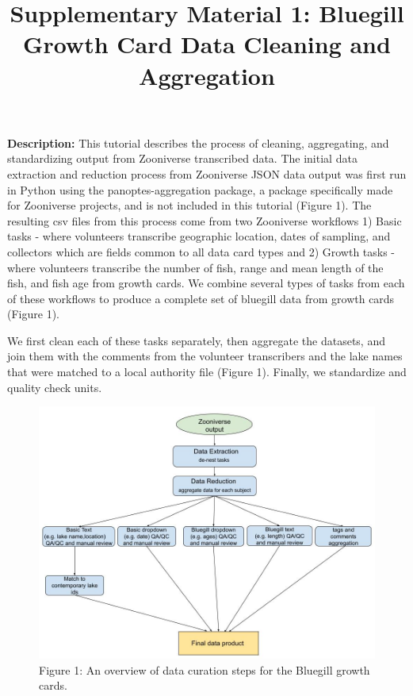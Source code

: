 \documentclass[
]{article}
\title{Supplementary Material 1: Bluegill Growth Card Data Cleaning and
Aggregation}
\author{}
\date{\vspace{-2.5em}}
\begin{document}
\maketitle

\textbf{Description:} This tutorial describes the process of cleaning,
aggregating, and standardizing output from Zooniverse transcribed data.
The initial data extraction and reduction process from Zooniverse JSON
data output was first run in Python using the panoptes-aggregation
package, a package specifically made for Zooniverse projects, and is not
included in this tutorial (Figure 1). The resulting csv files from this
process come from two Zooniverse workflows 1) Basic tasks - where
volunteers transcribe geographic location, dates of sampling, and
collectors which are fields common to all data card types and 2) Growth
tasks - where volunteers transcribe the number of fish, range and mean
length of the fish, and fish age from growth cards. We combine several
types of tasks from each of these workflows to produce a complete set of
bluegill data from growth cards (Figure 1).

We first clean each of these tasks separately, then aggregate the
datasets, and join them with the comments from the volunteer
transcribers and the lake names that were matched to a local authority
file (Figure 1). Finally, we standardize and quality check units.

\begin{figure}
\centering
\includegraphics{images/curation_steps.jpg}
\caption{Figure 1: An overview of data curation steps for the Bluegill
growth cards.}
\end{figure}
\end{document}

